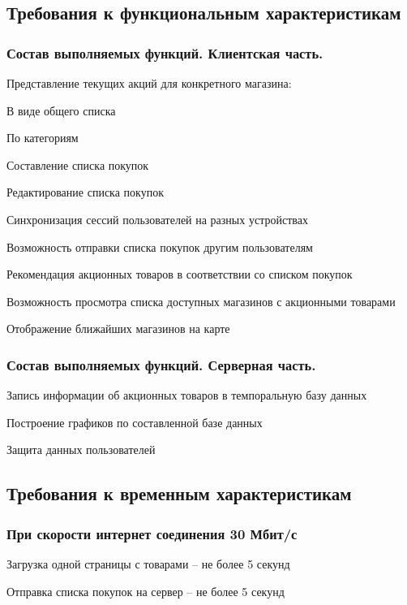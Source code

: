 \subsection{Требования к функциональным характеристикам}

\subsubsection{Состав выполняемых функций. Клиентская часть.}
\begin{my_enumerate}
\item Представление текущих акций для конкретного магазина:
    \begin{my_enumerate}
    \item В виде общего списка
    \item По категориям
    \end{my_enumerate}
\item Составление списка покупок
\item Редактирование списка покупок
\item Синхронизация сессий пользователей на разных устройствах
\item Возможность отправки списка покупок другим пользователям
\item Рекомендация акционных товаров в соответствии со списком покупок
\item Возможность просмотра списка доступных магазинов с акционными товарами
\item Отображение ближайших магазинов на карте
\end{my_enumerate}

\subsubsection{Состав выполняемых функций. Серверная часть.}
\begin{my_enumerate}
\item Запись информации об акционных товаров в темпоральную базу данных
\item Построение графиков по составленной базе данных
\item Защита данных пользователей
\end{my_enumerate}

\subsection{Требования к временным характеристикам}

\subsubsection{При скорости интернет соединения 30 Мбит/с}
\begin{my_enumerate}
\item Загрузка одной страницы с товарами -- не более 5 секунд
\item Отправка списка покупок на сервер -- не более 5 секунд
\end{my_enumerate}


